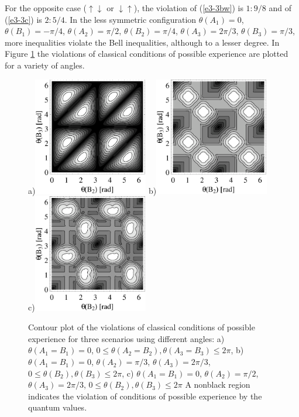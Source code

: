 For the opposite case ($\uparrow \downarrow$ or $\downarrow \uparrow$), the violation of
(\ref{e3-3bw}) is $1:9/8$ and of
(\ref{e3-3c}) is $2:5/4$.
In the less symmetric configuration
$\theta(A_1) = 0$,
$\theta(B_1) = -\pi /4$,
$\theta(A_2) = \pi / 2$,
$\theta(B_2) = \pi / 4$,
$\theta(A_3) = 2\pi /3$,
$\theta(B_3) = \pi / 3$,
more inequalities violate the Bell inequalities, although to a lesser degree.
 In Figure \ref{2000-poly-f2} the violations of
 classical conditions of possible experience are
 plotted for a variety of angles.
 \begin{figure}
 \begin{center}
  a)\includegraphics[width=5cm]{2000-poly-f3.eps}
  b)\includegraphics[width=5cm]{2000-poly-f4.eps}
  c)\includegraphics[width=5cm]{2000-poly-f5.eps}
 \end{center}
  \caption{Contour plot of the violations of
 classical conditions of possible experience for three scenarios using different angles:
 a)
 $\theta(A_1 = B_1) = 0$,
 $0\le \theta(A_2 = B_2), \theta(A_3 = B_3) \le 2\pi$,
 b)
 $\theta(A_1=B_1) = 0$,
 $\theta(A_2) = \pi/3$,
 $\theta(A_3) = 2\pi/3$,
 $0\le \theta(B_2) ,\theta(B_3) \le 2\pi$,
 c)
 $\theta(A_1=B_1) = 0$,
 $\theta(A_2) = \pi/2$,
 $\theta(A_3) = 2\pi/3$,
 $0\le \theta(B_2) ,\theta(B_3) \le 2\pi$
 A nonblack region indicates the violation of conditions
 of possible experience by the quantum values.}
 \label{2000-poly-f2}
 \end{figure}



